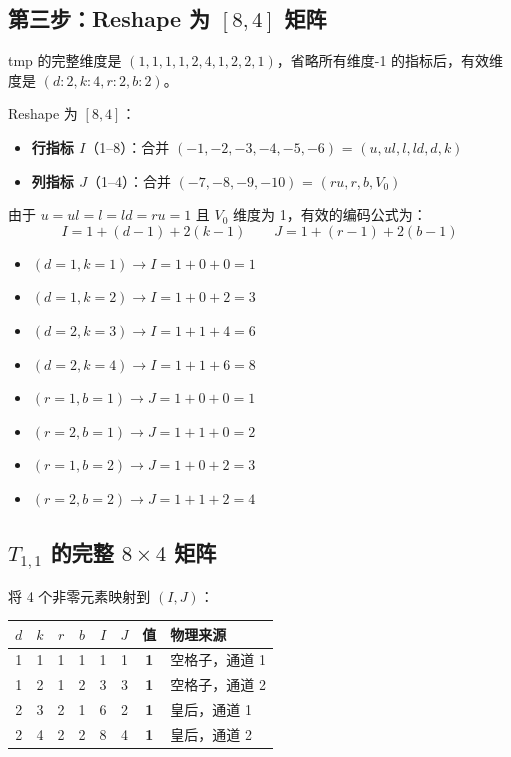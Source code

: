 \documentclass[12pt,a4paper]{article}
\begin{document}
\subsection{第三步：Reshape 为 $[8, 4]$ 矩阵}

tmp 的完整维度是 $(1,1,1,1,2,4,1,2,2,1)$，省略所有维度-1 的指标后，有效维度是 $(d{:}2, k{:}4, r{:}2, b{:}2)$。

Reshape 为 $[8, 4]$：
\begin{itemize}
  \item \textbf{行指标 $I$}（1--8）：合并 $(-1,-2,-3,-4,-5,-6)$ = $(u,ul,l,ld,d,k)$
  \item \textbf{列指标 $J$}（1--4）：合并 $(-7,-8,-9,-10)$ = $(ru,r,b,V_0)$
\end{itemize}

由于 $u=ul=l=ld=ru=1$ 且 $V_0$ 维度为 1，有效的编码公式为：
$$\boxed{I = 1 + (d - 1) + 2(k - 1)} \qquad \boxed{J = 1 + (r - 1) + 2(b - 1)}$$

\begin{exbox}[编码实例]
\begin{itemize}
  \item $(d{=}1, k{=}1) \to I = 1 + 0 + 0 = 1$
  \item $(d{=}1, k{=}2) \to I = 1 + 0 + 2 = 3$
  \item $(d{=}2, k{=}3) \to I = 1 + 1 + 4 = 6$
  \item $(d{=}2, k{=}4) \to I = 1 + 1 + 6 = 8$
  \item $(r{=}1, b{=}1) \to J = 1 + 0 + 0 = 1$
  \item $(r{=}2, b{=}1) \to J = 1 + 1 + 0 = 2$
  \item $(r{=}1, b{=}2) \to J = 1 + 0 + 2 = 3$
  \item $(r{=}2, b{=}2) \to J = 1 + 1 + 2 = 4$
\end{itemize}
\end{exbox}

\subsection{$T_{1,1}$ 的完整 $8 \times 4$ 矩阵}

将 4 个非零元素映射到 $(I, J)$：

\begin{center}
\begin{tabular}{cccc|cc|c|l}
\toprule
$d$ & $k$ & $r$ & $b$ & $I$ & $J$ & 值 & 物理来源 \\
\midrule
1 & 1 & 1 & 1 & 1 & 1 & \textbf{1} & 空格子，通道 1 \\
1 & 2 & 1 & 2 & 3 & 3 & \textbf{1} & 空格子，通道 2 \\
2 & 3 & 2 & 1 & 6 & 2 & \textbf{1} & 皇后，通道 1 \\
2 & 4 & 2 & 2 & 8 & 4 & \textbf{1} & 皇后，通道 2 \\
\bottomrule
\end{tabular}
\end{center}
\end{document}
